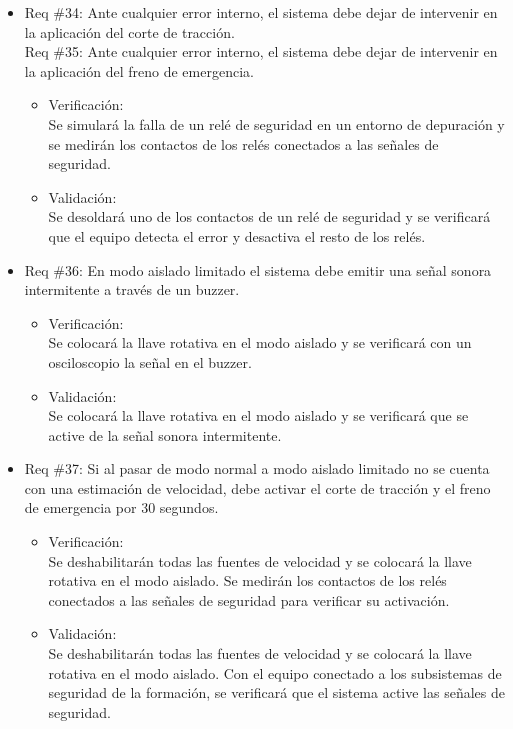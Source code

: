\documentclass[11pt]{charter}
\begin{document}
\begin{itemize}
\item Req \#34: Ante cualquier error interno, el sistema debe dejar de intervenir en la aplicación del corte de tracción. \\
Req \#35: Ante cualquier error interno, el sistema debe dejar de intervenir en la aplicación del freno de emergencia.
\begin{itemize}
  \item Verificación:\\
  Se simulará la falla de un relé de seguridad en un entorno de depuración y se medirán los contactos de los relés conectados a las señales de seguridad.
  \item Validación:\\
  Se desoldará uno de los contactos de un relé de seguridad y se verificará que el equipo detecta el error y desactiva el resto de los relés.
\end{itemize}

\item Req \#36: En modo aislado limitado el sistema debe emitir una señal sonora intermitente a través de un buzzer.
\begin{itemize}
  \item Verificación:\\
  Se colocará la llave rotativa en el modo aislado y se verificará con un osciloscopio la señal en el buzzer.
  \item Validación:\\
  Se colocará la llave rotativa en el modo aislado y se verificará que se active de la señal sonora intermitente.
\end{itemize}

\item Req \#37: Si al pasar de modo normal a modo aislado limitado no se cuenta con una estimación de velocidad, debe activar el corte de tracción y el freno de emergencia por 30 segundos.
\begin{itemize}
  \item Verificación:\\
  Se deshabilitarán todas las fuentes de velocidad y se colocará la llave rotativa en el modo aislado.
  Se medirán los contactos de los relés conectados a las señales de seguridad para verificar su activación.
  \item Validación:\\
  Se deshabilitarán todas las fuentes de velocidad y se colocará la llave rotativa en el modo aislado.
  Con el equipo conectado a los subsistemas de seguridad de la formación, se verificará que el sistema active las señales de seguridad.
\end{itemize}


\end{itemize}
\end{document}
